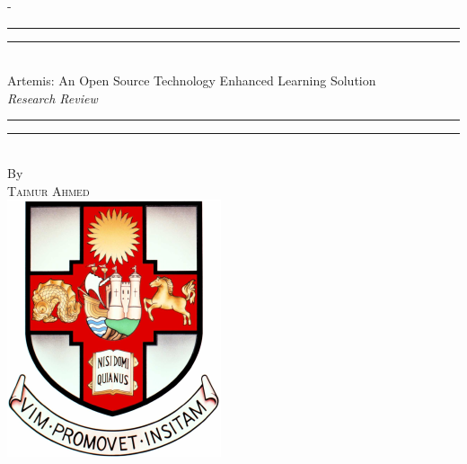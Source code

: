 %
%
% 
%
%
\begin{titlingpage}
\begin{SingleSpace}
\calccentering{\unitlength} 
\begin{adjustwidth*}{\unitlength}{-\unitlength}
\vspace*{13mm}
\begin{center}
\rule[0.5ex]{\linewidth}{2pt}\vspace*{-\baselineskip}\vspace*{3.2pt}
\rule[0.5ex]{\linewidth}{1pt}\\[\baselineskip]
{\HUGE Artemis: An Open Source
Technology Enhanced Learning Solution }\\[4mm]
{\Large \textit{Research Review}}\\
\rule[0.5ex]{\linewidth}{1pt}\vspace*{-\baselineskip}\vspace{3.2pt}
\rule[0.5ex]{\linewidth}{2pt}\\
\vspace{6.5mm}
{\large By}\\
\vspace{6.5mm}
{\large\textsc{Taimur Ahmed}}\\
\vspace{11mm}
\includegraphics[scale=0.6]{logos/bristolcrest_colour}\\

\end{center}
\end{adjustwidth*}
\end{SingleSpace}
\end{titlingpage}
